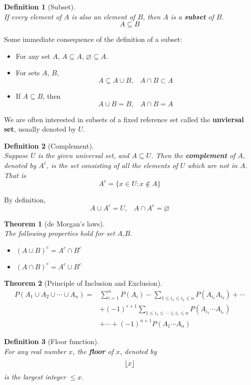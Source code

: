 \documentclass[12pt]{article}
\DeclarePairedDelimiter\floor{\lfloor}{\rfloor}
\newtheorem{definition}{Definition}[section]
\newtheorem{theorem}{Theorem}[section]
\theoremstyle{definition}
\begin{document}
\begin{definition}[Subset]
\hfill\\\normalfont If every element of $A$ is also an element of $B$, then $A$ is a \textbf{subset} of $B$.
\[
A\subseteq B
\]
\end{definition}
Some immediate consequence of the definition of a subset:
\begin{itemize}
  \item For any set $A$, $A\subseteq A$, $\varnothing\subseteq A$.
  \item For sets $A$, $B$,
  \[
A\subseteq A\cup B, \;\;\;A\cap B \subset A
  \]
  \item If $A\subseteq B$, then
  \[
A\cup B = B,\;\;\; A\cap B = A
  \] 
\end{itemize}
We are often interested in subsets of a fixed reference set called the \textbf{unviersal set}, usually denoted by $U$.
\begin{definition}[Complement]
\hfill\\\normalfont Suppose $U$ is the given universal set, and $A\subseteq U$. Then the \textbf{complement} of $A$, denoted by $A^c$, is the set consisting of all the elements of $U$ which are not in $A$. That is
\[
A^c = \{x\in U: x\not\in A\}
\] 
\end{definition}
By definition,
\[
A\cup A^c = U,\;\;\; A\cap A^c = \varnothing
\]
\begin{theorem}[de Morgan's laws]
\hfill\\\normalfont The following properties hold for set $A$,$B$.
\begin{itemize}
  \item $(A\cup B)^c = A^c\cap B^c$
  \item $(A\cap B)^c = A^c\cup B^c$
\end{itemize}
\end{theorem}
\begin{theorem}[Principle of Inclusion and Exclusion]
\begin{equation*}
\begin{aligned}
P(A_1\cup A_2\cup \cdots\cup A_n)=&\sum_{i=1}^n P(A_i) -\sum_{1\leq i_1\leq i_2\leq n}P(A_{i_1}A_{i_2})+\cdots\\&+(-1)^{r+1}\sum_{1\leq i_1\leq\cdots\leq i_r\leq n}P(A_{i_1}\cdots A_{i_r})\\&+\cdots+(-1)^{n+1}P(A_1\cdots A_n)
\end{aligned}
\end{equation*}
\end{theorem}
\begin{definition}[Floor function]
\hfill\\\normalfont For any real number $x$, the \textbf{floor} of $x$, denoted by
\[
\floor*{x}
\]
is the largest integer $\leq x$.
\end{definition}
\end{document}
